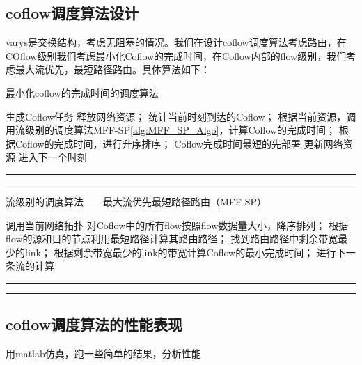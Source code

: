 \documentclass[a4paper, 11pt]{article}                                                   %
\begin{document}
\begin{CJK*}{UTF8}{song}
\subsection{coflow调度算法设计}
varys是交换结构，考虑无阻塞的情况。我们在设计coflow调度算法考虑路由，在COflow级别我们考虑最小化Coflow的完成时间，在Coflow内部的flow级别，我们考虑最大流优先，最短路径路由。具体算法如下：

\begin{algorithm}[H]
    \caption{最小化coflow的完成时间的调度算法}
    \label{alg:min_cct_Algo} %
    \begin{algorithmic}[1]  %
    \STATE 生成Coflow任务
            \STATE 释放网络资源；
        \ENDIF
        \STATE 统计当前时刻到达的Coflow；
            \STATE 根据当前资源，调用流级别的调度算法MFF-SP\ref{alg:MFF_SP_Algo}，计算Coflow的完成时间；
            \STATE 根据Coflow的完成时间，进行升序排序；
            \STATE Coflow完成时间最短的先部署
            \STATE 更新网络资源
        \ELSE
            \STATE 进入下一个时刻
        \ENDIF
    \ENDFOR
    \end{algorithmic}
\end{algorithm}
\noindent\hrule
\vspace{0.1em}\noindent\hrule

\begin{algorithm}[H]
    \caption{流级别的调度算法——最大流优先最短路径路由（MFF-SP）}
    \label{alg:MFF_SP_Algo} %
    \begin{algorithmic}[1]  %
    \STATE 调用当前网络拓扑
    \STATE 对Coflow中的所有flow按照flow数据量大小，降序排列；
            \STATE 根据flow的源和目的节点利用最短路径计算其路由路径；
            \STATE 找到路由路径中剩余带宽最少的link；
            \STATE 根据剩余带宽最少的link的带宽计算Coflow的最小完成时间；
        \ELSE
            \STATE 进行下一条流的计算
        \ENDIF
    \ENDFOR
    \end{algorithmic}
\end{algorithm}
\noindent\hrule
\vspace{0.1em}\noindent\hrule
\subsection{coflow调度算法的性能表现}
用matlab仿真，跑一些简单的结果，分析性能

\end{CJK*}
\end{document}
